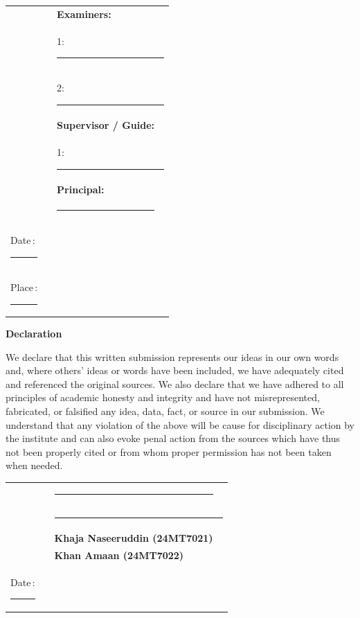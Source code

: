 \vspace{0.4in}
\begin{table}[h]
\begin{tabular}{llll}
 &  & \textbf{Examiners:} & \\[10pt]
 & \hspace{1.2in} & \multicolumn{2}{l}{1:\enspace\rule{5cm}{0.4pt}} \\[8pt]
 &  & \multicolumn{2}{l}{2:\enspace\rule{5cm}{0.4pt}} \\[10pt]
 &  & \textbf{Supervisor / Guide:} & \\[8pt]
 &  & \multicolumn{2}{l}{1:\enspace\rule{5cm}{0.4pt}} \\[8pt]
 &  & \textbf{Principal:} & \\[8pt]
 &  & \rule{4.5cm}{0.4pt} & \\[14pt]
Date\,:\enspace\rule{5cm}{0.4pt} &  & & \\[4pt]
Place\,:\enspace\rule{5cm}{0.4pt} &  & &
\end{tabular}
\end{table}

\newpage
\begin{center}
{\Large\textbf{Declaration}}\\[10pt]
\end{center}
We declare that this written submission represents our ideas in our own words and, where others' ideas or words have been included, we have adequately cited and referenced the original sources. We also declare that we have adhered to all principles of academic honesty and integrity and have not misrepresented, fabricated, or falsified any idea, data, fact, or source in our submission. We understand that any violation of the above will be cause for disciplinary action by the institute and can also evoke penal action from the sources which have thus not been properly cited or from whom proper permission has not been taken when needed.

\vspace{0.4in}
\begin{table}[h]
\centering
\begin{tabular}{llll}
   &  & \rule{7cm}{0.4pt} & \\[8pt]
   &  & \multicolumn{2}{l}{\rule{7cm}{0.4pt}} \\[8pt]
   &  & \textbf{Khaja Naseeruddin (24MT7021)} & \\[2pt]
   &  & \textbf{Khan Amaan (24MT7022)} & \\[14pt]
Date\,:\enspace\rule{5cm}{0.4pt} &  & &
\end{tabular}
\end{table}

